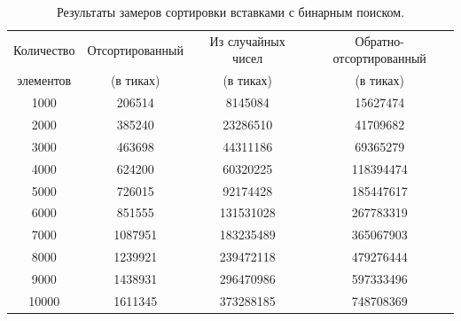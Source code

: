\documentclass[a4paper, 14pt]{article}
\begin{document}
    \begin{table}[h]
        \caption{Результаты замеров сортировки вставками с бинарным поиском.}
            \begin{tabular}{ | c | c | c | c | }
                \hline
                 Количество   &  Отсортированный   &  Из случайных чисел  &  Обратно-отсортированный \\
                 элементов &  (в тиках) & (в тиках) & (в тиках) \\ \hline  
                   1000 &    206514  &    8145084   &    15627474  \\
                    2000 &    385240  &    23286510  &    41709682  \\
                    3000 &    463698  &    44311186  &    69365279  \\
                    4000 &    624200  &    60320225  &    118394474 \\
                    5000 &    726015  &    92174428  &    185447617 \\
                    6000 &    851555  &    131531028 &    267783319 \\
                    7000 &    1087951 &    183235489 &    365067903 \\
                    8000 &    1239921 &    239472118 &    479276444 \\
                    9000 &    1438931 &    296470986 &    597333496 \\
                    10000&    1611345 &    373288185 &    748708369 \\
                \hline
            \end{tabular}
        \label{tab:bin_ins_sort}
    \end{table}
\end{document}

